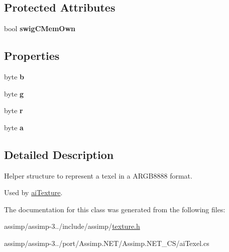 \subsection*{Protected Attributes}
\begin{DoxyCompactItemize}
\item 
\hypertarget{structai_texel_a4eda7db8a743d54dede6e5e2d00aa862}{bool {\bfseries swig\+C\+Mem\+Own}}\label{structai_texel_a4eda7db8a743d54dede6e5e2d00aa862}

\end{DoxyCompactItemize}
\subsection*{Properties}
\begin{DoxyCompactItemize}
\item 
\hypertarget{structai_texel_ac933f98869c2761f5996c6f5639ae140}{byte {\bfseries b}}\label{structai_texel_ac933f98869c2761f5996c6f5639ae140}

\item 
\hypertarget{structai_texel_a8f7017e0c09082d7dc7415b01e65c8f0}{byte {\bfseries g}}\label{structai_texel_a8f7017e0c09082d7dc7415b01e65c8f0}

\item 
\hypertarget{structai_texel_a8a830a523057f315cdc6cea8a646f26e}{byte {\bfseries r}}\label{structai_texel_a8a830a523057f315cdc6cea8a646f26e}

\item 
\hypertarget{structai_texel_ac226dac2fcdfaa03c14643f88f598c02}{byte {\bfseries a}}\label{structai_texel_ac226dac2fcdfaa03c14643f88f598c02}

\end{DoxyCompactItemize}


\subsection{Detailed Description}
Helper structure to represent a texel in a A\+R\+G\+B8888 format. 

Used by \hyperlink{structai_texture}{ai\+Texture}. 

The documentation for this class was generated from the following files\+:\begin{DoxyCompactItemize}
\item 
assimp/assimp-\/3../include/assimp/\hyperlink{texture_8h}{texture.\+h}\item 
assimp/assimp-\/3../port/\+Assimp.\+N\+E\+T/\+Assimp.\+N\+E\+T\+\_\+\+C\+S/ai\+Texel.\+cs\end{DoxyCompactItemize}
